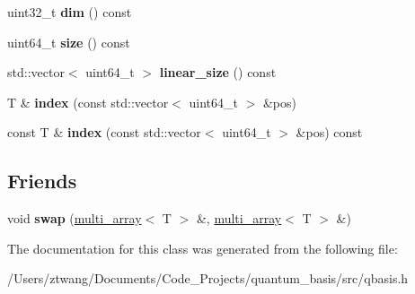 \begin{DoxyCompactItemize}
\mbox{\label{classqbasis_1_1multi__array_a2c1bfcc8fe3c7940089c461d201b1571}} 
uint32\+\_\+t {\bfseries dim} () const
\item 
\mbox{\label{classqbasis_1_1multi__array_a82aab31fbc7a315e5861796b63f503eb}} 
uint64\+\_\+t {\bfseries size} () const
\item 
\mbox{\label{classqbasis_1_1multi__array_aef35a306447f3e2822a1acfc3d87b1c1}} 
std\+::vector$<$ uint64\+\_\+t $>$ {\bfseries linear\+\_\+size} () const
\item 
\mbox{\label{classqbasis_1_1multi__array_a6bc95cb735a98fa2ed3267f245865a51}} 
T \& {\bfseries index} (const std\+::vector$<$ uint64\+\_\+t $>$ \&pos)
\item 
\mbox{\label{classqbasis_1_1multi__array_a0ab5d8f37c9e7a3810e71020d7d1e244}} 
const T \& {\bfseries index} (const std\+::vector$<$ uint64\+\_\+t $>$ \&pos) const
\end{DoxyCompactItemize}
\subsection*{Friends}
\begin{DoxyCompactItemize}
\item 
\mbox{\label{classqbasis_1_1multi__array_afe6466291618fe32c4be831b8ca25a1c}} 
void {\bfseries swap} (\hyperlink{classqbasis_1_1multi__array}{multi\+\_\+array}$<$ T $>$ \&, \hyperlink{classqbasis_1_1multi__array}{multi\+\_\+array}$<$ T $>$ \&)
\end{DoxyCompactItemize}


The documentation for this class was generated from the following file\+:\begin{DoxyCompactItemize}
\item 
/\+Users/ztwang/\+Documents/\+Code\+\_\+\+Projects/quantum\+\_\+basis/src/qbasis.\+h\end{DoxyCompactItemize}
